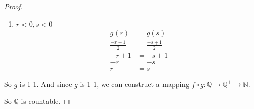 \documentclass[12pt,letterpaper]{article}
\begin{document}
\begin{enumerate}
\begin{enumerate}
\begin{proof}
\begin{enumerate}
              \item $r < 0, s < 0$
                \begin{align*}
                  g(r) &= g(s) \\
                  \frac{-r + 1}{2} &= \frac{-s + 1}{2} \\
                  -r + 1 &= -s + 1 \\
                  -r &= -s \\
                  r &= s
                \end{align*}

            \end{enumerate}

            So $g$ is 1-1.
            And since $g$ is 1-1, we can construct a mapping
            $f \circ g : \mathbb{Q} \rightarrow \mathbb{Q}^+ \rightarrow \mathbb{N}$.

            So $\mathbb{Q}$ is countable.
          \end{proof}
      \end{enumerate}
  \end{enumerate}
\end{document}
